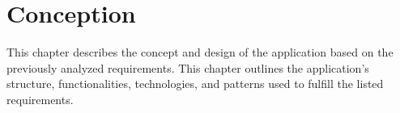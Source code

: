 \chapter{Conception}
This chapter describes the concept and design of the application based on the previously analyzed requirements. This chapter outlines the application's structure, functionalities, technologies, and patterns used to fulfill the listed requirements.







